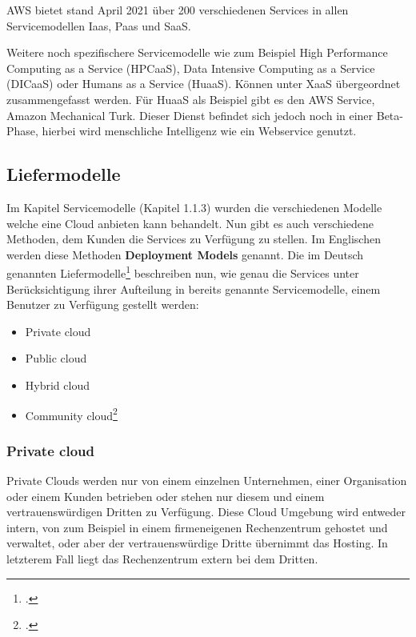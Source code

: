 AWS bietet stand April 2021 über 200 verschiedenen Services in allen Servicemodellen Iaas, Paas und SaaS.

Weitere noch spezifischere Servicemodelle wie zum Beispiel High Performance Computing as a Service (HPCaaS), Data Intensive Computing as a Service (DICaaS) oder Humans as a Service (HuaaS). Können unter XaaS übergeordnet zusammengefasst werden. Für HuaaS als Beispiel gibt es den AWS Service, Amazon Mechanical Turk. Dieser Dienst befindet sich jedoch noch in einer Beta-Phase, hierbei wird menschliche Intelligenz wie ein Webservice genutzt.

\subsection{Liefermodelle}
Im Kapitel Servicemodelle (Kapitel 1.1.3) wurden die verschiedenen Modelle welche eine Cloud anbieten kann behandelt. Nun gibt es auch verschiedene Methoden, dem Kunden die Services zu Verfügung zu stellen.
Im Englischen werden diese Methoden \textbf{Deployment Models} genannt. Die im Deutsch genannten Liefermodelle\footcite{Lehrunterlagen-HTL-cloud} beschreiben nun, wie genau die Services unter Berücksichtigung ihrer Aufteilung in bereits genannte Servicemodelle, einem Benutzer zu Verfügung gestellt werden:
\begin{itemize}
	\item Private cloud
	\item Public cloud
	\item Hybrid cloud
	\item Community cloud\footcite{cloud-types-pic}
\end{itemize}
\subsubsection{Private cloud}
Private Clouds werden nur von einem einzelnen Unternehmen, einer Organisation oder einem Kunden betrieben oder stehen nur diesem und einem vertrauenswürdigen Dritten zu Verfügung. Diese Cloud Umgebung wird entweder intern, von zum Beispiel in einem firmeneigenen Rechenzentrum gehostet und verwaltet, oder aber der vertrauenswürdige Dritte übernimmt das Hosting. In letzterem Fall liegt das Rechenzentrum extern bei dem Dritten.

